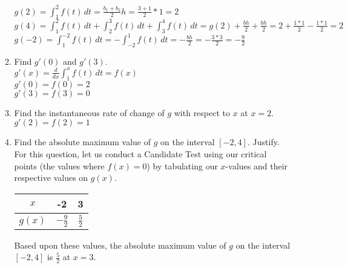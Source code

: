 \documentclass[10pt, letterpaper]{report}
\begin{document}
\begin{enumerate}
\begin{enumerate}
      $g(2) = \int_{1}^{2}{f(t)}\,dt = \frac{b_{1}+b_{2}}{2}h =
      \frac{3+1}{2}*1 = 2$ \\

      $g(4) = \int_{1}^{2}{f(t)}\,dt + \int_{2}^{3}{f(t)}\,dt + \int_{3}^{4}{f(t)}\,dt =
      g(2) + \frac{bh}{2} + \frac{bh}{2} =
      2 + \frac{1*1}{2} - \frac{1*1}{2} = 2$ \\

      $g(-2) = \int_{1}^{-2}{f(t)}\,dt =
      -\int_{-2}^{1}{f(t)}\,dt = -\frac{bh}{2} =
      -\frac{3*3}{2} = -\frac{9}{2}$ \\

    \item{Find $g'(0)$ and $g'(3)$.} \\

      $g'(x) = \frac{d}{dx}\int_{1}^{x}{f(t)}\,dt = f(x)$ \\

      $g'(0) = f(0) = 2$ \\

      $g'(3) = f(3) = 0$ \\

    \item{Find the instantaneous rate of change of $g$ with respect to $x$ at $x=2$.} \\

      $g'(2) = f(2) = 1$ \\

    \item{Find the absolute maximum value of $g$ on the interval $[-2,4]$. Justify.} \\

      For this question, let us conduct a Candidate Test using our critical points (the values where $f(x)=0$) by tabulating our $x$-values and their respective values on $g(x)$.

      \begin{center}
        \begin{tabular}{| c | c | c |}
          \hline
          $x$ & -2 & 3 \\
          \hline
          $g(x)$ & $-\frac{9}{2}$ & $\frac{5}{2}$  \\
          \hline
        \end{tabular}
      \end{center}

      Based upon these values, the absolute maximum value of $g$ on the interval $[-2,4]$ is $\frac{5}{2}$ at $x=3$. \\


\end{enumerate}
\end{enumerate}
\end{document}
